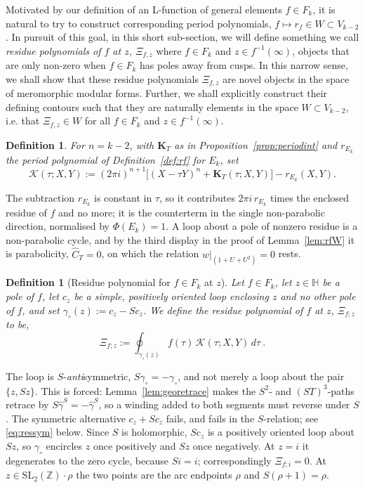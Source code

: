 \documentclass[11pt]{article}
\newtheorem{definition}[theorem]{Definition}
\newcommand{\HH}{\mathbb{H}}
\newcommand{\ZZ}{\mathbb{Z}}
\newcommand{\SLZ}{\mathrm{SL}_2(\ZZ)}
\begin{document}
Motivated by our definition of an L-function of general elements $f \in F_k$, it is natural to try to construct 
corresponding period polynomials, $f \mapsto r_f \in W \subset V_{k-2}$. In pursuit of this goal, in this short 
sub-section, we will define something we call \emph{residue polynomials of $f$ at $z$, $\Xi_{f, z}$} where 
$f \in F_k$ and $z \in f^{-1}(\infty)$, objects that are only non-zero when $f \in F_k$ has poles away from 
cusps. In this narrow sense, we shall show that these residue polynomials $\Xi_{f,z}$ are novel objects in 
the space of meromorphic modular forms. Further, we shall explicitly construct their defining contours such 
that they are naturally elements in the space $W \subset V_{k-2}$, i.e. that $\Xi_{f,z} \in W$ for all $f \in F_k$ 
and $z \in f^{-1}(\infty)$.

\begin{definition}\label{def:reskernel}
For $n=k-2$, with $\mathbf K_T$ as in Proposition~\ref{prop:periodint} and $r_{E_k}$ the period
polynomial of Definition~\ref{def:rf} for $E_k$, set
\begin{equation}\label{eq:reskernel}
\mathcal K(\tau;X,Y):=(2\pi i)^{n+1}\Big[(X-\tau Y)^n+\mathbf K_T(\tau;X,Y)\Big]-r_{E_k}(X,Y).
\end{equation}
\end{definition}

The subtraction $r_{E_k}$ is constant in $\tau$, so it contributes $2\pi i\,r_{E_k}$ times the
enclosed residue of $f$ and no more; it is the counterterm in the single non-parabolic direction,
normalised by $\Phi(E_k)=1$. A loop about a pole of nonzero residue is a non-parabolic cycle, and
by the third display in the proof of Lemma~\ref{lem:rfW} it is parabolicity, $\hat C_T=0$, on which
the relation $w|_{(1+U+U^2)}=0$ rests.

\begin{definition}[Residue polynomial for $f \in F_k$ at $z$]\label{def:respoly}
Let $f \in F_k$, let $z \in \HH$ be a pole of $f$, let $c_z$ be a simple, positively oriented loop
enclosing $z$ and no other pole of $f$, and set $\gamma_\circ(z) := c_z - S c_z$. We define
\emph{the residue polynomial of $f$ at $z$}, $\Xi_{f;z}$ to be,
\begin{equation}\label{eq:respoly}
\Xi_{f;z} := \oint_{\gamma_\circ(z)} f(\tau)\,\mathcal K(\tau;X,Y)\,d\tau~.
\end{equation}
\end{definition}

The loop is $S$-\emph{anti}symmetric, $S\gamma_\circ=-\gamma_\circ$, and not merely a loop about
the pair $\{z,Sz\}$. This is forced: Lemma~\ref{lem:georetrace} makes the $S^2$- and $(ST)^3$-paths
retrace by $S\hat\gamma^S=-\hat\gamma^S$, so a winding added to both segments must reverse under
$S$. The symmetric alternative $c_z+Sc_z$ fails, and fails in the $S$-relation; see
\eqref{eq:ressym} below. Since $S$ is holomorphic, $Sc_z$ is a positively oriented loop about
$Sz$, so $\gamma_\circ$ encircles $z$ once positively and $Sz$ once negatively. At $z=i$ it
degenerates to the zero cycle, because $Si=i$; correspondingly $\Xi_{f;i}=0$. At
$z\in\SLZ\!\cdot\!\rho$ the two points are the arc endpoints $\rho$ and $S(\rho+1)=\rho$.
\end{document}
